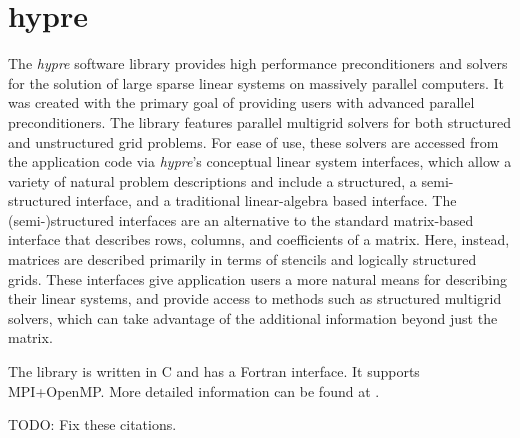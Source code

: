 \section{hypre}


The {\sl hypre} software library provides high performance preconditioners and solvers for the solution of large sparse linear systems on massively parallel computers. It was created with the primary goal of providing users with advanced parallel preconditioners.
The library features parallel multigrid solvers for both structured and unstructured grid problems. 
For ease of use, these solvers are accessed from the application code via {\sl hypre}'s conceptual linear system interfaces, which allow a variety of natural problem descriptions and include a structured, a semi-structured interface, and a traditional linear-algebra based interface. The (semi-)structured interfaces are an alternative to the standard matrix-based interface that describes rows, columns, and coefficients of a matrix. Here, instead, matrices are described primarily in terms of stencils and logically structured grids. These interfaces give application users a more natural means for describing their linear systems, and provide access to methods such as structured multigrid solvers, which can take advantage of the additional information beyond just the matrix. 

The library is written in C and has a Fortran interface. It supports MPI+OpenMP.
More detailed information can be found at \cite{hypre_webpage, hypre_usr_manual}.

{\color{red}TODO: Fix these citations.}

